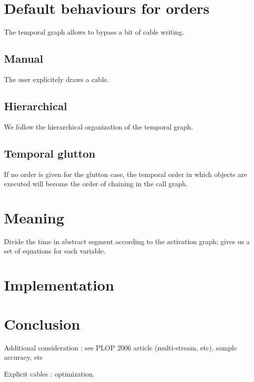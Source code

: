 \documentclass[a4paper,twocolumns]{article}
\begin{document}
    \section{Default behaviours for orders}
    The temporal graph allows to bypass a bit of cable writing.
    
    \subsection{Manual}
    The user explicitely draws a cable.
    
    \subsection{Hierarchical}
    We follow the hierarchical organization of the temporal graph.
    
    
    \subsection{Temporal glutton}
    If no order is given for the glutton case, the temporal order in which objects are executed
    will become the order of chaining in the call graph.
    
	\section{Meaning}
	Divide the time in abstract segment according to the activation graph; gives us a set of equations for each variable.
	\section{Implementation}
    \section{Conclusion}
    Additional consideration : see PLOP 2006 article (multi-stream, etc), sample accuracy, etc
    
    Explicit cables : optimization.
\end{document}

